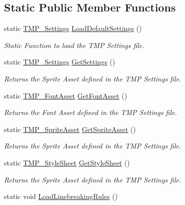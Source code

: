 \subsection*{Static Public Member Functions}
\begin{DoxyCompactItemize}
\item 
static \mbox{\hyperlink{class_t_m_pro_1_1_t_m_p___settings}{T\+M\+P\+\_\+\+Settings}} \mbox{\hyperlink{class_t_m_pro_1_1_t_m_p___settings_a586aa8771d85a11d12f209991844571e}{Load\+Default\+Settings}} ()
\begin{DoxyCompactList}\small\item\em Static Function to load the T\+MP Settings file. \end{DoxyCompactList}\item 
static \mbox{\hyperlink{class_t_m_pro_1_1_t_m_p___settings}{T\+M\+P\+\_\+\+Settings}} \mbox{\hyperlink{class_t_m_pro_1_1_t_m_p___settings_a6bebbf1faa299871253f2c1517938c2a}{Get\+Settings}} ()
\begin{DoxyCompactList}\small\item\em Returns the Sprite Asset defined in the T\+MP Settings file. \end{DoxyCompactList}\item 
static \mbox{\hyperlink{class_t_m_pro_1_1_t_m_p___font_asset}{T\+M\+P\+\_\+\+Font\+Asset}} \mbox{\hyperlink{class_t_m_pro_1_1_t_m_p___settings_a2075e0ea181b5570c581f648d2deea6c}{Get\+Font\+Asset}} ()
\begin{DoxyCompactList}\small\item\em Returns the Font Asset defined in the T\+MP Settings file. \end{DoxyCompactList}\item 
static \mbox{\hyperlink{class_t_m_pro_1_1_t_m_p___sprite_asset}{T\+M\+P\+\_\+\+Sprite\+Asset}} \mbox{\hyperlink{class_t_m_pro_1_1_t_m_p___settings_a834d3c09ca86adf247e938f9eda8bd97}{Get\+Sprite\+Asset}} ()
\begin{DoxyCompactList}\small\item\em Returns the Sprite Asset defined in the T\+MP Settings file. \end{DoxyCompactList}\item 
static \mbox{\hyperlink{class_t_m_pro_1_1_t_m_p___style_sheet}{T\+M\+P\+\_\+\+Style\+Sheet}} \mbox{\hyperlink{class_t_m_pro_1_1_t_m_p___settings_a1aa17efbcaa8a567d58fecb204d02fc5}{Get\+Style\+Sheet}} ()
\begin{DoxyCompactList}\small\item\em Returns the Sprite Asset defined in the T\+MP Settings file. \end{DoxyCompactList}\item 
static void \mbox{\hyperlink{class_t_m_pro_1_1_t_m_p___settings_a62c9400a6bead12907767a9c56aad083}{Load\+Linebreaking\+Rules}} ()
\end{DoxyCompactItemize}
